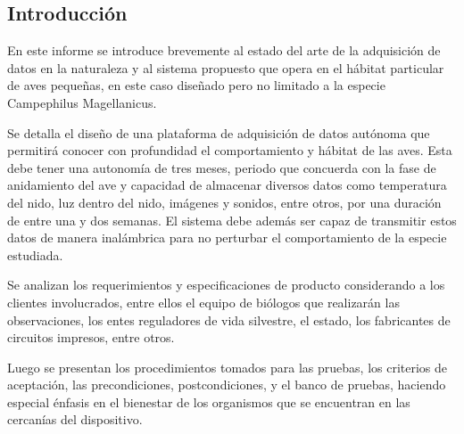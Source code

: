 %

%

\subsection{Introducción}


En este informe se introduce brevemente al estado del arte de la adquisición de datos en la naturaleza y al sistema propuesto que opera en el hábitat particular de aves pequeñas, en este caso diseñado pero no limitado a la especie Campephilus Magellanicus. 

Se detalla el diseño de una plataforma de adquisición de datos autónoma que permitirá conocer con profundidad el comportamiento y hábitat de las aves. Esta debe tener una autonomía de tres meses, periodo que concuerda con la fase de anidamiento del ave y capacidad de almacenar diversos datos como temperatura del nido, luz dentro del nido, imágenes y sonidos, entre otros, por una duración de entre una y dos semanas. El sistema debe además ser capaz de transmitir estos datos de manera inalámbrica para no perturbar el comportamiento de la especie estudiada.

Se analizan los requerimientos y especificaciones de producto considerando a los clientes involucrados, entre ellos el equipo de biólogos que realizarán las observaciones, los entes reguladores de vida silvestre, el estado, los fabricantes de circuitos impresos, entre otros.

Luego se presentan los procedimientos tomados para las pruebas, los criterios de aceptación, las precondiciones, postcondiciones, y el banco de pruebas, haciendo especial énfasis en el bienestar de los organismos que se encuentran en las cercanías del dispositivo.



%